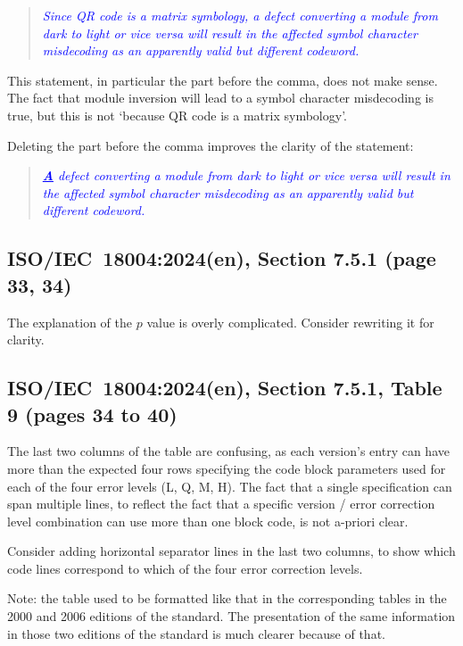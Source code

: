 \documentclass[a4paper,twoside]{article}
\newcommand{\shortstandard}{ISO/IEC~18004}
\newcommand{\standard}{\shortstandard:2024(en)}
\newcommand{\quotestandard}[1]{\textcolor{blue}{\textit{#1}}}
\newcommand{\change}[1]{\underline{\textbf{#1}}}
\begin{document}
\begin{quote}
\quotestandard{Since QR code is a matrix symbology, a defect converting a module from dark to light or vice versa
will result in the affected symbol character misdecoding as an apparently valid but different codeword.}
\end{quote}

This statement, in particular the part before the comma, does not make sense. The fact that module
inversion will lead to a symbol character misdecoding is true, but this is not `because QR code is a
matrix symbology'.

Deleting the part before the comma improves the clarity of the statement:

\begin{quote}
\quotestandard{\change{A} defect converting a module from dark to light or vice versa will result in the affected symbol
character misdecoding as an apparently valid but different codeword.}
\end{quote}

\subsection{\standard, Section 7.5.1 (page 33, 34)}

The explanation of the $p$ value is overly complicated. Consider rewriting it for clarity.

\subsection{\standard, Section 7.5.1, Table 9 (pages 34 to 40)}

The last two columns of the table are confusing, as each version's entry can have more than the expected
four rows specifying the code block parameters used for each of the four error levels (L, Q, M, H). The
fact that a single specification can span multiple lines, to reflect the fact that a specific
version / error correction level combination can use more than one block code, is not a-priori clear.

Consider adding horizontal separator lines in the last two columns, to show
which code lines correspond to which of the four error correction levels.

Note: the table used to be formatted like that in the corresponding tables in the 2000
and 2006 editions of the standard. The presentation of the same information in those two
editions of the standard is much clearer because of that.
\end{document}
